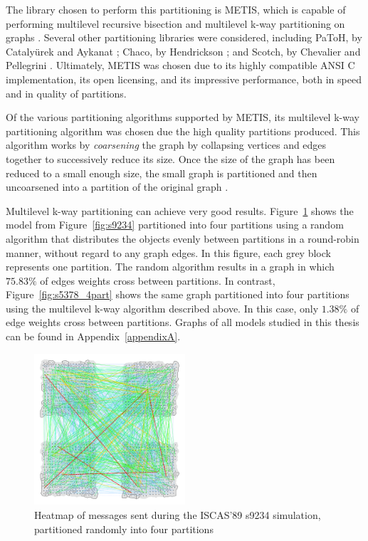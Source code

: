 \documentclass[11pt]{book}
\begin{document}
The library chosen to perform this partitioning is METIS, which is capable of performing multilevel recursive bisection and multilevel k-way partitioning on graphs \cite{karypis-98}. Several other partitioning libraries were considered, including PaToH, by Catalyürek and Aykanat \cite{catalyurek-11}; Chaco, by Hendrickson \cite{hendrickson-94}; and Scotch, by Chevalier and Pellegrini \cite{chevalier-08}. Ultimately, METIS was chosen due to its highly compatible ANSI C implementation, its open licensing, and its impressive performance, both in speed and in quality of partitions.

Of the various partitioning algorithms supported by METIS, its multilevel k-way partitioning algorithm was chosen due the high quality partitions produced. This algorithm works by \emph{coarsening} the graph by collapsing vertices and edges together to successively reduce its size. Once the size of the graph has been reduced to a small enough size, the small graph is partitioned and then uncoarsened into a partition of the original graph \cite{karypis-98}.

Multilevel k-way partitioning can achieve very good results. Figure~\ref{fig:s5378_4rr} shows the model from Figure~\ref{fig:s9234} partitioned into four partitions using a random algorithm that distributes the objects evenly between partitions in a round-robin manner, without regard to any graph edges. In this figure, each grey block represents one partition. The random algorithm results in a graph in which \(75.83\%\) of edges weights cross between partitions. In contrast, Figure~\ref{fig:s5378_4part} shows the same graph partitioned into four partitions using the multilevel k-way algorithm described above. In this case, only \(1.38\%\) of edge weights cross between partitions. Graphs of all models studied in this thesis can be found in Appendix~\ref{appendixA}.

\begin{figure}[ht]\label{fig:s5378_4rr}
\centering
\includegraphics[clip=true,width=0.5\textwidth]{figs/s9234_4rr}
\caption{Heatmap of messages sent during the ISCAS'89 s9234 simulation, partitioned randomly into four partitions}
\end{figure}
\end{document}
